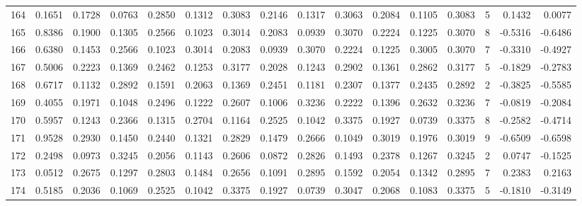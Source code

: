 \begin{tabular}{lrrrrrrrrrrrrrrr}
164 &      0.1651 &  0.1728 &  0.0763 &  0.2850 &  0.1312 &  0.3083 &  0.2146 &  0.1317 &  0.3063 &  0.2084 &   0.1105 &     0.3083 &      5 &                    0.1432 &                     0.0077 \\
165 &      0.8386 &  0.1900 &  0.1305 &  0.2566 &  0.1023 &  0.3014 &  0.2083 &  0.0939 &  0.3070 &  0.2224 &   0.1225 &     0.3070 &      8 &                   -0.5316 &                    -0.6486 \\
166 &      0.6380 &  0.1453 &  0.2566 &  0.1023 &  0.3014 &  0.2083 &  0.0939 &  0.3070 &  0.2224 &  0.1225 &   0.3005 &     0.3070 &      7 &                   -0.3310 &                    -0.4927 \\
167 &      0.5006 &  0.2223 &  0.1369 &  0.2462 &  0.1253 &  0.3177 &  0.2028 &  0.1243 &  0.2902 &  0.1361 &   0.2862 &     0.3177 &      5 &                   -0.1829 &                    -0.2783 \\
168 &      0.6717 &  0.1132 &  0.2892 &  0.1591 &  0.2063 &  0.1369 &  0.2451 &  0.1181 &  0.2307 &  0.1377 &   0.2435 &     0.2892 &      2 &                   -0.3825 &                    -0.5585 \\
169 &      0.4055 &  0.1971 &  0.1048 &  0.2496 &  0.1222 &  0.2607 &  0.1006 &  0.3236 &  0.2222 &  0.1396 &   0.2632 &     0.3236 &      7 &                   -0.0819 &                    -0.2084 \\
170 &      0.5957 &  0.1243 &  0.2366 &  0.1315 &  0.2704 &  0.1164 &  0.2525 &  0.1042 &  0.3375 &  0.1927 &   0.0739 &     0.3375 &      8 &                   -0.2582 &                    -0.4714 \\
171 &      0.9528 &  0.2930 &  0.1450 &  0.2440 &  0.1321 &  0.2829 &  0.1479 &  0.2666 &  0.1049 &  0.3019 &   0.1976 &     0.3019 &      9 &                   -0.6509 &                    -0.6598 \\
172 &      0.2498 &  0.0973 &  0.3245 &  0.2056 &  0.1143 &  0.2606 &  0.0872 &  0.2826 &  0.1493 &  0.2378 &   0.1267 &     0.3245 &      2 &                    0.0747 &                    -0.1525 \\
173 &      0.0512 &  0.2675 &  0.1297 &  0.2803 &  0.1484 &  0.2656 &  0.1091 &  0.2895 &  0.1592 &  0.2054 &   0.1342 &     0.2895 &      7 &                    0.2383 &                     0.2163 \\
174 &      0.5185 &  0.2036 &  0.1069 &  0.2525 &  0.1042 &  0.3375 &  0.1927 &  0.0739 &  0.3047 &  0.2068 &   0.1083 &     0.3375 &      5 &                   -0.1810 &                    -0.3149 \\

\end{tabular}
